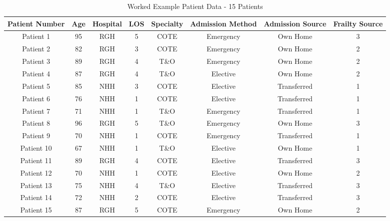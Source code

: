 \documentclass[../thesis.tex]{subfiles}
\begin{document}
\begin{table}[h!]
    \centering
    \begin{adjustbox}{width=\columnwidth}
    \begin{tabular}{cccccccc}\toprule
       \textbf{Patient Number}  & \textbf{Age} & \textbf{Hospital} & \textbf{LOS} & \textbf{Specialty} &\textbf{Admission Method} & \textbf{Admission Source} & \textbf{Frailty Source} \\\midrule
        Patient 1 & 95 & RGH & 5 & COTE & Emergency & Own Home & 3 \\ 
        Patient 2 & 82 & RGH & 3 & COTE & Emergency & Own Home & 2 \\
        Patient 3 & 89 & RGH & 4& T\&O & Emergency & Own Home & 2 \\
        Patient 4 & 87 & RGH & 4 & T\&O & Elective & Own Home & 2 \\
        Patient 5 & 85 & NHH & 3 & COTE & Elective & Transferred & 1 \\
        Patient 6 & 76 & NHH & 1 & COTE & Elective & Transferred & 1\\
        Patient 7 & 71 & NHH & 1 & T\&O & Emergency & Transferred & 1 \\
        Patient 8 & 96 & RGH & 5 & T\&O & Emergency & Own Home & 3 \\
        Patient 9 & 70 & NHH & 1 & COTE & Emergency & Transferred & 1\\
        Patient 10 & 67 & NHH & 1 & T\&O & Elective & Own Home & 1\\
        Patient 11 & 89 & RGH & 4 & COTE & Elective & Transferred & 3\\
        Patient 12 & 70 & NHH & 1 & COTE & Elective & Own Home & 2\\
        Patient 13 & 75 & NHH & 4 & T\&O & Elective & Transferred & 3\\
        Patient 14 & 72 & NHH & 2 & COTE & Elective & Transferred & 3\\
        Patient 15 & 87 & RGH & 5 & COTE & Emergency & Own Home & 2\\\bottomrule
    \end{tabular}
    \end{adjustbox}
    \caption{Worked Example Patient Data - 15 Patients}
\end{table}
\end{document}
